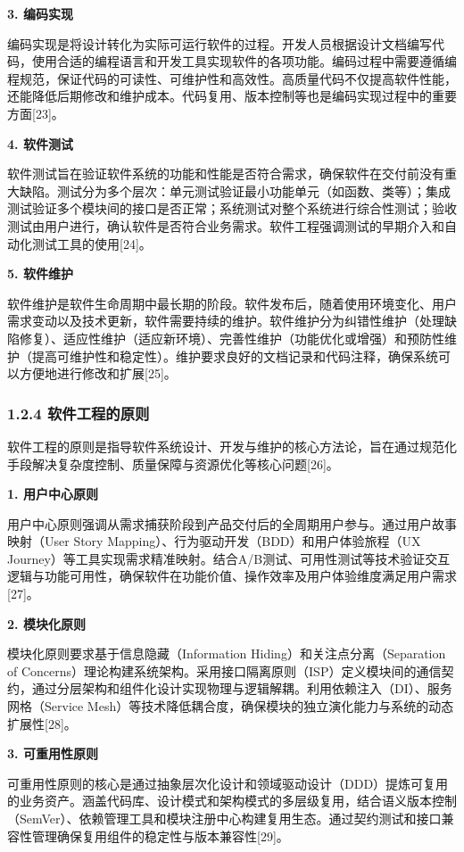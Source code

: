 \textbf{3. 编码实现}

编码实现是将设计转化为实际可运行软件的过程。开发人员根据设计文档编写代码，使用合适的编程语言和开发工具实现软件的各项功能。编码过程中需要遵循编程规范，保证代码的可读性、可维护性和高效性。高质量代码不仅提高软件性能，还能降低后期修改和维护成本。代码复用、版本控制等也是编码实现过程中的重要方面{[}23{]}。

\textbf{4. 软件测试}

软件测试旨在验证软件系统的功能和性能是否符合需求，确保软件在交付前没有重大缺陷。测试分为多个层次：单元测试验证最小功能单元（如函数、类等）；集成测试验证多个模块间的接口是否正常；系统测试对整个系统进行综合性测试；验收测试由用户进行，确认软件是否符合业务需求。软件工程强调测试的早期介入和自动化测试工具的使用{[}24{]}。

\textbf{5. 软件维护}

软件维护是软件生命周期中最长期的阶段。软件发布后，随着使用环境变化、用户需求变动以及技术更新，软件需要持续的维护。软件维护分为纠错性维护（处理缺陷修复）、适应性维护（适应新环境）、完善性维护（功能优化或增强）和预防性维护（提高可维护性和稳定性）。维护要求良好的文档记录和代码注释，确保系统可以方便地进行修改和扩展{[}25{]}。

\subsubsection{1.2.4 软件工程的原则}\label{ux8f6fux4ef6ux5de5ux7a0bux7684ux539fux5219}

软件工程的原则是指导软件系统设计、开发与维护的核心方法论，旨在通过规范化手段解决复杂度控制、质量保障与资源优化等核心问题{[}26{]}。

\textbf{1. 用户中心原则}

用户中心原则强调从需求捕获阶段到产品交付后的全周期用户参与。通过用户故事映射（User Story Mapping）、行为驱动开发（BDD）和用户体验旅程（UX Journey）等工具实现需求精准映射。结合A/B测试、可用性测试等技术验证交互逻辑与功能可用性，确保软件在功能价值、操作效率及用户体验维度满足用户需求{[}27{]}。

\textbf{2. 模块化原则}

模块化原则要求基于信息隐藏（Information Hiding）和关注点分离（Separation of Concerns）理论构建系统架构。采用接口隔离原则（ISP）定义模块间的通信契约，通过分层架构和组件化设计实现物理与逻辑解耦。利用依赖注入（DI）、服务网格（Service Mesh）等技术降低耦合度，确保模块的独立演化能力与系统的动态扩展性{[}28{]}。

\textbf{3. 可重用性原则}

可重用性原则的核心是通过抽象层次化设计和领域驱动设计（DDD）提炼可复用的业务资产。涵盖代码库、设计模式和架构模式的多层级复用，结合语义版本控制（SemVer）、依赖管理工具和模块注册中心构建复用生态。通过契约测试和接口兼容性管理确保复用组件的稳定性与版本兼容性{[}29{]}。


